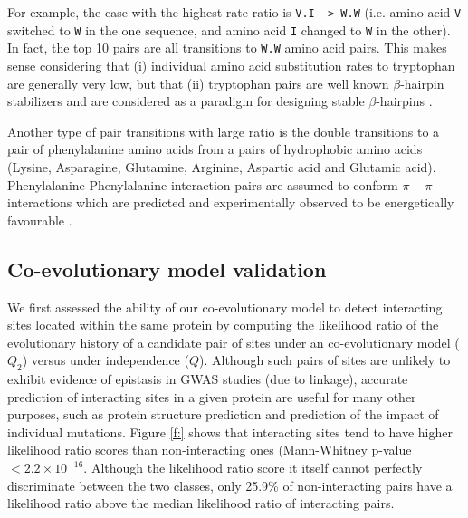 For example, the case with the highest rate ratio is \texttt{V.I -> W.W} (i.e. amino acid \texttt{V} switched to \texttt{W} in the one sequence, and amino acid \texttt{I} changed to \texttt{W} in the other). In fact, the top 10 pairs are all transitions to \texttt{W.W} amino acid pairs. This makes sense considering that (i) individual amino acid substitution rates to tryptophan are generally very low, but that (ii) tryptophan pairs are well known $\beta$-hairpin stabilizers and are considered as a paradigm for designing stable $\beta$-hairpins \cite{santiveri2010tryptophan}.

Another type of pair transitions with large ratio is the double transitions to a pair of phenylalanine amino acids from a pairs of hydrophobic amino acids (Lysine, Asparagine, Glutamine, Arginine, Aspartic acid and Glutamic acid). Phenylalanine-Phenylalanine interaction pairs are assumed to conform $\pi-\pi$ interactions which are predicted and experimentally observed to be energetically favourable \cite{hunter1991pi}.

\subsection{Co-evolutionary model validation}

We first assessed the ability of our co-evolutionary model to detect interacting sites located within the same protein by computing the likelihood ratio of the evolutionary history of a candidate pair of sites under an co-evolutionary model ($Q_2$) versus under independence ($Q$). Although such pairs of sites are unlikely to exhibit evidence of epistasis in GWAS studies (due to linkage), accurate prediction of interacting sites in a given protein are useful for many other purposes, such as protein structure prediction and prediction of the impact of individual mutations.  Figure \ref{f:} shows that interacting sites tend to have higher likelihood ratio scores than non-interacting ones (Mann-Whitney p-value $< 2.2 \times 10^{-16}$. Although the likelihood ratio score it itself cannot perfectly discriminate between the two classes, only 25.9\% of non-interacting pairs have a likelihood ratio above the median likelihood ratio of interacting pairs. 


